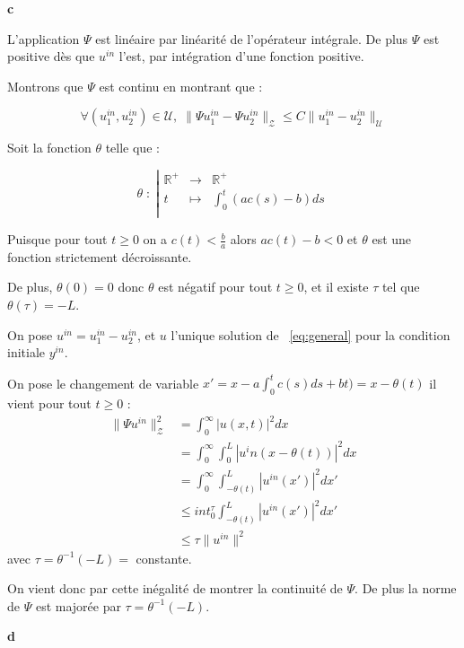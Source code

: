 \documentclass[a4paper]{article}
\newcommand{\Y}{\mathscr{U}}
\newcommand{\Z}{\mathscr{Z}}
\begin{document}
\textbf{c}

L'application $\Psi$ est linéaire par linéarité de l'opérateur intégrale.
De plus $\Psi $ est positive dès que $u^{in}$ l'est, par intégration d'une fonction positive.

Montrons que $\Psi$ est continu en montrant que :

\[ \forall (u_1^{in}, u_2^{in}) \in \Y, \; \| \Psi u_1^{in} - \Psi u_2^{in} \|_{\Z} \leq  C \| u_1^{in} - u_2^{in} \|_{\Y}\]

Soit la fonction $\theta$ telle que :

\[\theta \; : \; \left\vert
	\begin{array}{ccc}
	\mathbb{R}^+ & \to & \mathbb{R}^+\\
	t & \mapsto & \int_0^t (ac(s)-b)ds \\
	\end{array} \right.
\]

Puisque pour tout $t \geq 0 $ on a $c(t)< \frac{b}{a}$ alors $ac(t)-b<0$ et $\theta$ est une fonction strictement décroissante.

De plus, $\theta (0) =0$ donc $\theta$ est négatif pour tout $t \geq 0$,
et il existe $\tau$ tel que $\theta(\tau) = - L$.

On pose $u^{in} = u_1^{in} - u_2^{in}$, et $u$ l'unique solution de ~\eqref{eq:general} pour la condition initiale $y^{in}$.

On pose le changement de variable $x'=x - a\int_0^tc(s)ds + bt) = x - \theta (t)$ il vient pour tout $t \geq 0$ :
\[ \begin{split}
\|\Psi u^{in}\|_{\Z}^2 &= \int_0^\infty |u(x,t)|^2 dx \\
			   &= \int_0^\infty \int_0^L |u^in( x - \theta(t))|^2 dx \\
			   &= \int_0^\infty \int_{-\theta(t)}^{L} |u^{in}(x')|^2 dx' \\
			   & \leq int_0^\tau \int_{-\theta(t)}^L |u^{in}(x')|^2 dx'\\
			   & \leq \tau \| u^{in} \|^2
\end{split}\]
avec $\tau = \theta ^{-1}(-L) =$ constante.

On vient donc par cette inégalité de montrer la continuité de $\Psi$. De plus la norme de $\Psi$ est majorée par $\tau = \theta ^{-1}(-L)$.

\textbf{d}


	
\end{document}
